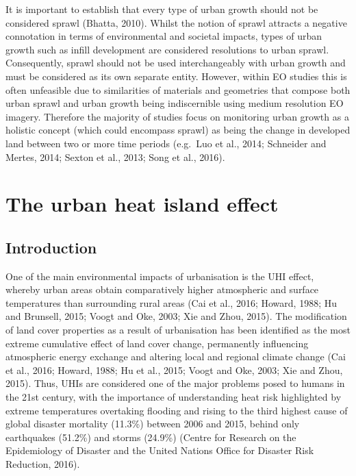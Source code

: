 \documentclass[]{book}
\begin{document}
It is important to establish that every type of urban growth should not
be considered sprawl (Bhatta, 2010). Whilst the notion of sprawl
attracts a negative connotation in terms of environmental and societal
impacts, types of urban growth such as infill development are considered
resolutions to urban sprawl. Consequently, sprawl should not be used
interchangeably with urban growth and must be considered as its own
separate entity. However, within EO studies this is often unfeasible due
to similarities of materials and geometries that compose both urban
sprawl and urban growth being indiscernible using medium resolution EO
imagery. Therefore the majority of studies focus on monitoring urban
growth as a holistic concept (which could encompass sprawl) as being the
change in developed land between two or more time periods (e.g.~Luo et
al., 2014; Schneider and Mertes, 2014; Sexton et al., 2013; Song et al.,
2016).

\section{The urban heat island
effect}\label{the-urban-heat-island-effect}

\subsection{Introduction}\label{introduction-1}

One of the main environmental impacts of urbanisation is the UHI effect,
whereby urban areas obtain comparatively higher atmospheric and surface
temperatures than surrounding rural areas (Cai et al., 2016; Howard,
1988; Hu and Brunsell, 2015; Voogt and Oke, 2003; Xie and Zhou, 2015).
The modification of land cover properties as a result of urbanisation
has been identified as the most extreme cumulative effect of land cover
change, permanently influencing atmospheric energy exchange and altering
local and regional climate change (Cai et al., 2016; Howard, 1988; Hu et
al., 2015; Voogt and Oke, 2003; Xie and Zhou, 2015). Thus, UHIs are
considered one of the major problems posed to humans in the 21st
century, with the importance of understanding heat risk highlighted by
extreme temperatures overtaking flooding and rising to the third highest
cause of global disaster mortality (11.3\%) between 2006 and 2015,
behind only earthquakes (51.2\%) and storms (24.9\%) (Centre for
Research on the Epidemiology of Disaster and the United Nations Office
for Disaster Risk Reduction, 2016).
\end{document}

